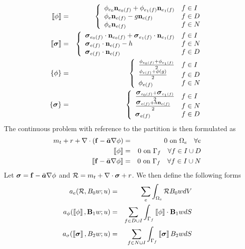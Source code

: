 \documentclass[10pt,dvips,twoside,reqno]{amsart}
\begin{document}
\begin{eqnarray}
\dbl \phi \dbr &=& \cbl \begin{array}{ll} 
\phi_{e_0} \vec n_{e_0(f)} + \phi_{e_1(f)} \vec n_{e_1(f)} & f \in I \\
\phi_{e} \vec n_{e(f)} - g \vec n_{e(f)} & f \in D \\
\phi_{e} \vec n_{e(f)} & f \in N \end{array} \right. \\
\dbl \gvec \sigma \dbr &=& \cbl \begin{array}{ll} \gvec \sigma_{e_0(f)} \cdot \vec n_{e_0(f)} + \gvec \sigma_{e_1(f)} \cdot \vec n_{e_1(f)} & f \in I \\
\gvec \sigma_{e(f)} \cdot \vec n_{e(f)} - h & f \in N \\
\gvec \sigma_{e(f)} \cdot \vec n_{e(f)} & f \in D \end{array} \right. \\
\cbl \phi \cbr &=& \cbl \begin{array}{ll} 
\frac{\phi_{e_0(f)}  + \phi_{e_1(f)}}{2} & f \in I \\
\frac{\phi_{e(f)} + \phi(g)}{2} & f \in D \\
\phi_{e(f)} & f \in N \end{array} \right. \\
\cbl \gvec \sigma \cbr &=& \cbl \begin{array}{ll} 
\frac{\gvec \sigma_{e_0(f)} + \gvec \sigma_{e_1(f)}}{2} & f \in I \\
\frac{\gvec \sigma_{e(f)} + h \vec n_{e(f)}}{2} & f \in N \\
\gvec \sigma_{e(f)} & f \in D \end{array} \right. 
\end{eqnarray}
The continuous problem with reference to the partition is then formulated as
\begin{eqnarray}
m_t + r + \deld \pl \vec f - \ten a \grad \phi \pr &=& 0 \mbox{ on } \Omega_e \quad \forall e \\
\dbl \phi \dbr &=& 0 \mbox{ on } \Gamma_f \quad \forall f \in I \cup D \\
\dbl \vec f - \ten a \grad \phi \dbr  &=& 0 \mbox{ on } \Gamma_f \quad \forall f \in I \cup N
\end{eqnarray}
Let $\mbox{{\boldmath ${\sigma}$}} ={\bf f} - \bar{\mbox{{\boldmath ${a}$}}} \nabla \phi $ and $\mathcal{R} = m_t
+ \nabla \cdot \mbox{{\boldmath ${\sigma}$}} + r$. We then define the following forms
\begin{eqnarray}
a_e(\mathcal{R},B_0 w;u) &=& \sum_e \int_{\Omega_e} \mathcal{R} B_0 w dV \\
a_{\phi}(\dbl \phi \dbr,\vec B_1 w;u) &=& \sum_{f\in D \cup I} \int_{\Gamma_f} \dbl \phi \dbr \cdot \vec B_1 w dS\\
a_{\sigma}(\dbl \gvec \sigma \dbr,B_2 w;u)  &=& \sum_{f \in N \cup I} \int_{\Gamma_f} \dbl \gvec \sigma \dbr B_2 w dS
\end{eqnarray}
\end{document}
